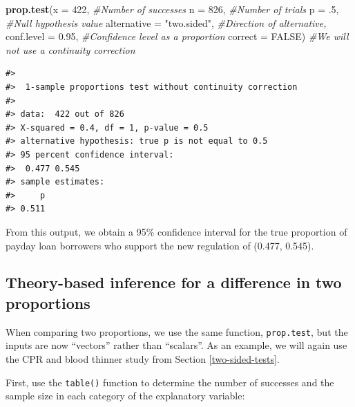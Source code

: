 \documentclass[
  10pt,
  openany]{book}
\newenvironment{Shaded}{\begin{snugshade}}{\end{snugshade}}
\newcommand{\AttributeTok}[1]{\textcolor[rgb]{0.13,0.29,0.53}{#1}}
\newcommand{\CommentTok}[1]{\textcolor[rgb]{0.56,0.35,0.01}{\textit{#1}}}
\newcommand{\ConstantTok}[1]{\textcolor[rgb]{0.56,0.35,0.01}{#1}}
\newcommand{\DecValTok}[1]{\textcolor[rgb]{0.00,0.00,0.81}{#1}}
\newcommand{\FloatTok}[1]{\textcolor[rgb]{0.00,0.00,0.81}{#1}}
\newcommand{\FunctionTok}[1]{\textcolor[rgb]{0.13,0.29,0.53}{\textbf{#1}}}
\newcommand{\NormalTok}[1]{#1}
\newcommand{\SpecialCharTok}[1]{\textcolor[rgb]{0.81,0.36,0.00}{\textbf{#1}}}
\newcommand{\StringTok}[1]{\textcolor[rgb]{0.31,0.60,0.02}{#1}}
\theoremstyle{definition}
\theoremstyle{definition}
\theoremstyle{definition}
\theoremstyle{definition}
\theoremstyle{remark}
\begin{document}
\begin{Shaded}
\begin{Highlighting}[]
\FunctionTok{prop.test}\NormalTok{(}\AttributeTok{x =} \DecValTok{422}\NormalTok{,  }\CommentTok{\#Number of successes}
          \AttributeTok{n =} \DecValTok{826}\NormalTok{, }\CommentTok{\#Number of trials}
          \AttributeTok{p =}\NormalTok{ .}\DecValTok{5}\NormalTok{, }\CommentTok{\#Null hypothesis value}
          \AttributeTok{alternative =} \StringTok{"two.sided"}\NormalTok{, }\CommentTok{\#Direction of alternative,}
          \AttributeTok{conf.level =} \FloatTok{0.95}\NormalTok{, }\CommentTok{\#Confidence level as a proportion}
          \AttributeTok{correct =} \ConstantTok{FALSE}\NormalTok{) }\CommentTok{\#We will not use  a continuity correction}
\end{Highlighting}
\end{Shaded}

\begin{verbatim}
#> 
#>  1-sample proportions test without continuity correction
#> 
#> data:  422 out of 826
#> X-squared = 0.4, df = 1, p-value = 0.5
#> alternative hypothesis: true p is not equal to 0.5
#> 95 percent confidence interval:
#>  0.477 0.545
#> sample estimates:
#>     p 
#> 0.511
\end{verbatim}

From this output, we obtain a 95\% confidence interval for the true proportion of payday loan borrowers who support the new regulation of (0.477, 0.545).

\subsection*{Theory-based inference for a difference in two proportions}\label{theory-based-inference-for-a-difference-in-two-proportions}

When comparing two proportions, we use the same function, \texttt{prop.test}, but the inputs are now ``vectors'' rather than ``scalars''. As an example, we will again use the CPR and blood thinner study from Section \ref{two-sided-tests}.

First, use the \texttt{table()} function to determine the number of successes and the sample size in each category of the explanatory variable:

\begin{Shaded}
\end{Shaded}
\end{document}
